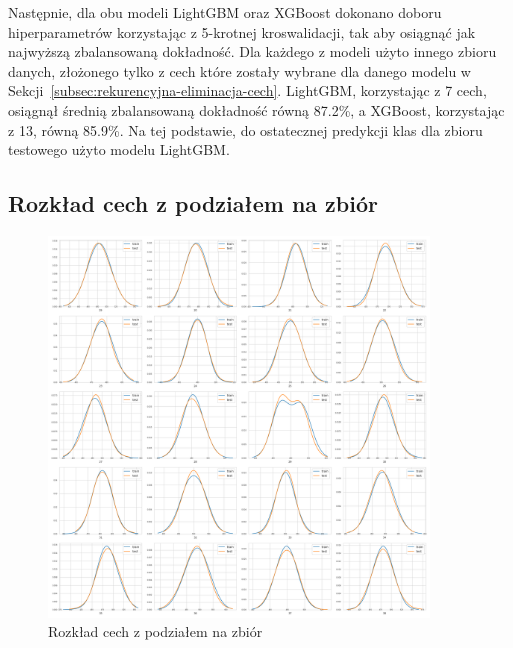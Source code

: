 \documentclass[a4paper,12pt]{article}
\begin{document}
    Następnie, dla obu modeli LightGBM oraz XGBoost dokonano doboru hiperparametrów korzystając z 5-krotnej kroswalidacji, tak aby osiągnąć jak najwyższą zbalansowaną dokładność.
    Dla każdego z modeli użyto innego zbioru danych, złożonego tylko z cech które zostały wybrane dla danego modelu w Sekcji~\ref{subsec:rekurencyjna-eliminacja-cech}.
    LightGBM, korzystając z 7 cech, osiągnął średnią zbalansowaną dokładność równą 87.2\%, a XGBoost, korzystając z 13, równą 85.9\%.
    Na tej podstawie, do ostatecznej predykcji klas dla zbioru testowego użyto modelu LightGBM\@.

    
    

    \newpage
    \begin{appendices}

        \section{Rozkład cech z podziałem na zbiór}\label{appendix:rozklad-cech-numerycznych-zbiory}

        \begin{figure}[!h]
            \centering
            \includegraphics[width=0.9\textwidth]{../images/feature-distribution-dataset.png}
            \caption{Rozkład cech z podziałem na zbiór}
        \end{figure}

        \newpage


\end{appendices}
\end{document}
